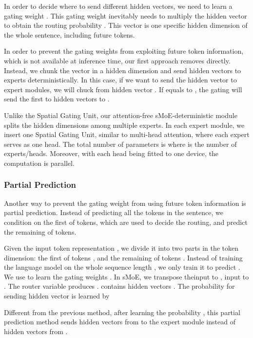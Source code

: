 \documentclass{article}
\begin{document}
In order to decide where to send different hidden vectors, we need to learn a gating weight . This gating weight inevitably needs to multiply the hidden vector  to obtain the routing probability . This vector is one specific hidden dimension of the whole sentence, including future tokens.

In order to prevent the gating weights from exploiting future token information, which is not available at inference time, our first approach removes  directly. Instead, we chunk the vector in a hidden dimension and send hidden vectors to experts deterministically. In this case, if we want to send the hidden vector  to  expert modules, we will chuck  from hidden vector . If  equals to , the gating will send the first to  hidden vectors to . 





Unlike the Spatial Gating Unit, our attention-free sMoE-deterministic module splits the hidden dimensions among multiple experts. In each expert module, we insert one Spatial Gating Unit, similar to multi-head attention, where each expert serves as one head. The total number of parameters is  where   is the number of experts/heads. Moreover, with each head being fitted to one device, the computation is parallel. 




\subsubsection{Partial Prediction}
\label{sec:partial_prediction}

Another way to prevent the gating weight  from using future token information is partial prediction. Instead of predicting all the tokens in the sentence, we condition on the first  of tokens, which are used to decide the routing, and predict the remaining  of tokens. 

Given the input token representation , we divide it into two parts in the token dimension: the first  of tokens , and the remaining  of tokens . Instead of training the language model on the whole sequence length , we only train it to predict . We use  to learn the gating weights . In sMoE, we transpose theinput  to , input  to . The router variable  produces .  contains  hidden vectors . The probability for sending  hidden vector is learned by



Different from the previous method, after learning the probability , this partial prediction method sends hidden vectors  from  to the expert module instead of hidden vectors from .
\end{document}
